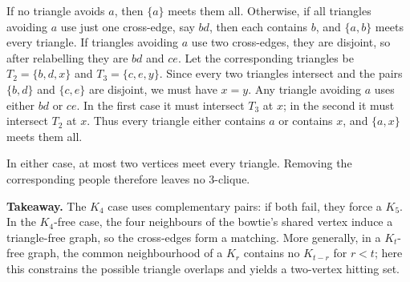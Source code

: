 If no triangle avoids $a$, then $\{a\}$ meets them all. Otherwise, if all triangles avoiding $a$ use just one cross-edge, say $bd$, then each contains $b$, and $\{a,b\}$ meets every triangle. If triangles avoiding $a$ use two cross-edges, they are disjoint, so after relabelling they are $bd$ and $ce$. Let the corresponding triangles be $T_2=\{b,d,x\}$ and $T_3=\{c,e,y\}$. Since every two triangles intersect and the pairs $\{b,d\}$ and $\{c,e\}$ are disjoint, we must have $x=y$. Any triangle avoiding $a$ uses either $bd$ or $ce$. In the first case it must intersect $T_3$ at $x$; in the second it must intersect $T_2$ at $x$. Thus every triangle either contains $a$ or contains $x$, and $\{a,x\}$ meets them all.

In either case, at most two vertices meet every triangle. Removing the corresponding people therefore leaves no $3$-clique.

\textbf{Takeaway.} The $K_4$ case uses complementary pairs: if both fail, they force a $K_5$. In the $K_4$-free case, the four neighbours of the bowtie's shared vertex induce a triangle-free graph, so the cross-edges form a matching. More generally, in a $K_t$-free graph, the common neighbourhood of a $K_r$ contains no $K_{t-r}$ for $r<t$; here this constrains the possible triangle overlaps and yields a two-vertex hitting set.

